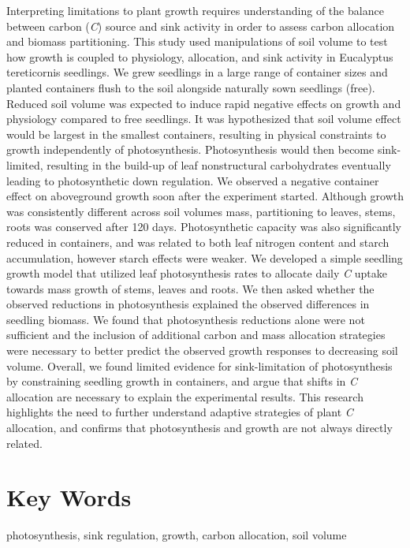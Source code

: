 \documentclass[a4paper]{article}\usepackage[]{graphicx}\usepackage[]{color}
\begin{document}
Interpreting limitations to plant growth requires understanding of the balance between carbon (\textit{C}) source and sink activity in order to assess carbon allocation and biomass partitioning. This study used manipulations of soil volume to test how growth is coupled to physiology, allocation, and sink activity in Eucalyptus tereticornis seedlings. We grew seedlings in a large range of container sizes and planted containers flush to the soil alongside naturally sown seedlings (free). Reduced soil volume was expected to induce rapid negative effects on growth and physiology compared to free seedlings. It was hypothesized that soil volume effect would be largest in the smallest containers, resulting in physical constraints to growth independently of photosynthesis. Photosynthesis would then become sink-limited, resulting in the build-up of leaf nonstructural carbohydrates eventually leading to photosynthetic down regulation. We observed a negative container effect on aboveground growth soon after the experiment started. Although growth was consistently different across soil volumes mass, partitioning to leaves, stems, roots was conserved after 120 days. Photosynthetic capacity was also significantly reduced in containers, and was related to both leaf nitrogen content and starch accumulation, however starch effects were weaker. We developed a simple seedling growth model that utilized leaf photosynthesis rates to allocate daily \textit{C} uptake towards mass growth of stems, leaves and roots. We then asked whether the observed reductions in photosynthesis explained the observed differences in seedling biomass.  We found that photosynthesis reductions alone were not sufficient and the inclusion of additional carbon and mass allocation strategies were necessary to better predict the observed growth responses to decreasing soil volume. Overall, we found limited evidence for sink-limitation of photosynthesis by constraining seedling growth in containers, and argue that shifts in \textit{C} allocation are necessary to explain the experimental results. This research highlights the need to further understand adaptive strategies of plant \textit{C} allocation, and confirms that photosynthesis and growth are not always directly related.

\section*{Key Words}

photosynthesis, sink regulation, growth, carbon allocation, soil volume
\end{document}
